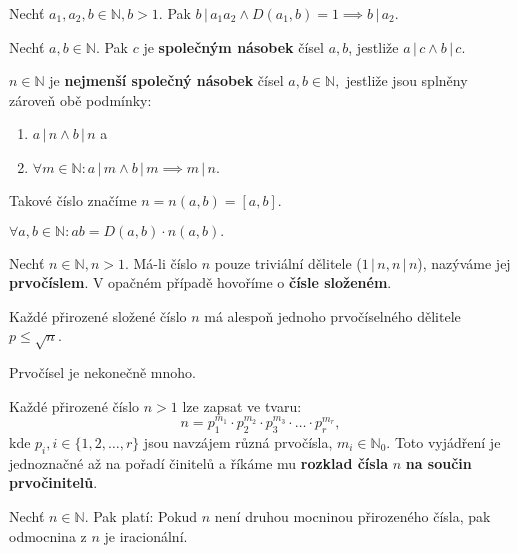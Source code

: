 \begin{veta}
  Nechť $a_1,a_2,b\in \mathbb N, b>1.$ Pak $b \, | \, a_1a_2 \land D(a_1,b)=1\implies b\, | \, a_2.$
\end{veta}

\begin{definition}
  Nechť $a,b\in \mathbb N.$ Pak $c$ je \textbf{společným násobek} čísel $a,b$, jestliže $a \, | \, c \land b\, | \, c.$
\end{definition}

\begin{definition}
  $n\in \mathbb N$ je \textbf{nejmenší společný násobek} čísel $a,b \in \mathbb N,$ jestliže jsou splněny zároveň obě podmínky:
  \begin{enumerate}[$i.$]
    \item $a\, | \, n \land b \, | \, n$ a
    \item $\forall m \in \mathbb N: a \, | \, m \land b \, | \, m \implies m \, | \, n.$
  \end{enumerate}
  Takové číslo značíme $n=n(a,b)=\left [ a,b\right ] .$
\end{definition}

\begin{veta}
  $\forall a,b \in \mathbb N: ab=D(a,b)\cdot n(a,b).$
\end{veta}

\begin{definition}
  Nechť $n\in \mathbb N, n>1.$ Má-li číslo $n$ pouze triviální dělitele ($1 \, | \, n, n \, | \, n$), nazýváme jej \textbf{prvočíslem}. V opačném případě hovoříme o \textbf{čísle složeném}.
\end{definition}

\begin{veta}
  Každé přirozené složené číslo $n$ má alespoň jednoho prvočíselného dělitele $p\leq \sqrt{n}$.
\end{veta}

\begin{veta}
  Prvočísel je nekonečně mnoho.
\end{veta}

\begin{veta}
  Každé přirozené číslo $n>1$ lze zapsat ve tvaru:
  $$n=p_1^{m_1}\cdot p_2^{m_2} \cdot p_3^{m_3}\cdot \hdots \cdot p_r^{m_r},$$
  kde $p_i,i\in\{ 1, 2, \dots, r \}$ jsou navzájem různá prvočísla, $m_i\in \mathbb N_0$. Toto vyjádření je jednoznačné až na pořadí činitelů a říkáme mu \textbf{rozklad čísla} $n$ \textbf{na součin prvočinitelů}.
\end{veta}

\begin{veta}
  Nechť $n\in \mathbb N.$ Pak platí: Pokud $n$ není druhou mocninou přirozeného čísla, pak odmocnina z $n$ je iracionální.
\end{veta}

